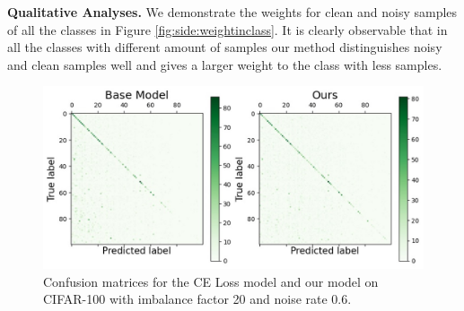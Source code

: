 \documentclass[letterpaper]{article} %
\newcommand{\bd}[1]{\textbf{#1}}
\begin{document}
\noindent\bd{Qualitative Analyses.} 
We demonstrate the weights for clean and noisy samples of all the classes in Figure \ref{fig:side:weightinclass}.
It is clearly observable that in all the classes with different amount of samples our method distinguishes noisy and clean samples well and gives a larger weight to the class with less samples.

\begin{figure}[t]
\begin{center}
   \includegraphics[width=1.0\linewidth]{figs/confusion.jpg}
\end{center}
\vspace{-0.50cm} 
   \caption{
   Confusion matrices for the CE Loss model and our model on CIFAR-100 with imbalance factor 20 and noise rate 0.6.}
\label{fig:side:confusion}
\vspace{-0.00cm} 
\end{figure}

\end{document}
